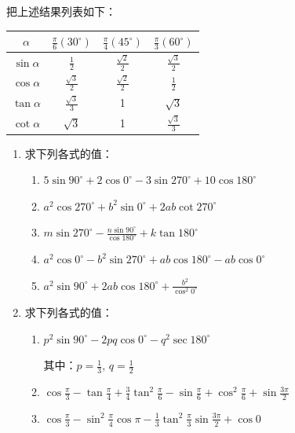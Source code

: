 把上述结果列表如下：
\begin{center}
\begin{tabular}{c|ccc}
\hline
$\alpha$  &  $\frac{\pi}{6}(30^{\circ})$   &  $\frac{\pi}{4}(45^{\circ})$   &  $\frac{\pi}{3}(60^{\circ})$   \\
\hline
$\sin\alpha$ & $\frac{1}{2}$& $\frac{\sqrt{2}}{2}$& $\frac{\sqrt{3}}{2}$\\
$\cos\alpha$ &  $\frac{\sqrt{3}}{2}$& $\frac{\sqrt{2}}{2}$& $\frac{1}{2}$\\
$\tan\alpha$ & $\frac{\sqrt{3}}{3}$ & 1 &$\sqrt{3}$\\
$\cot\alpha$& $\sqrt{3}$ &1& $\frac{\sqrt{3}}{3}$\\
\hline
\end{tabular}
\end{center}


\begin{ex}
\begin{enumerate}
    \item  求下列各式的值：
\begin{enumerate}
    \item $5\sin90^{\circ}+2\cos0^{\circ}-3\sin270^{\circ}+10\cos180^{\circ}$
    \item $a^2\cos270^{\circ}+b^2\sin0^{\circ}+2ab\cot270^{\circ}$
    \item $m\sin270^{\circ}-\frac{n\sin90^{\circ}}{\cos180^{\circ}}+k\tan 180^{\circ}$
    \item $a^2\cos0^{\circ}-b^2\sin270^{\circ}+ab\cos180^{\circ} - ab\cos0^{\circ}$
    \item $a^2\sin90^{\circ}+2ab\cos180^{\circ}+\frac{b^2}{\cos^2 0^{\circ}}
    $
\end{enumerate}

    \item 求下列各式的值：
\begin{enumerate}
    \item $p^2\sin90^{\circ}-2pq\cos0^{\circ}-q^2\sec180^{\circ}$
    
    其中：$p=\frac{1}{3}$, $q=\frac{1}{2}$
    \item $\cos\frac{\pi}{3}-\tan\frac{\pi}{4}+\frac{3}{4}\tan^2\frac{\pi}{6}-\sin\frac{\pi}{6}+\cos^2\frac{\pi}{6}+\sin\frac{3\pi}{2}$
    \item $\cos\frac{\pi}{3}-\sin^2\frac{\pi}{4}\cos\pi-\frac{1}{3}\tan^2\frac{\pi}{3}\sin \frac{3\pi}{2}+\cos0$
\end{enumerate}
\end{enumerate}
\end{ex}

